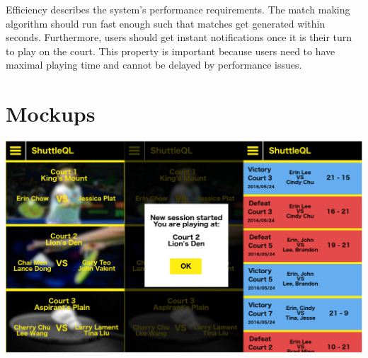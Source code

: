 \documentclass{article}
\begin{document}
Efficiency describes the system's performance requirements.
The match making algorithm should run fast enough such that matches get generated within seconds.
Furthermore, users should get instant notifications once it is their turn to play on the court.
This property is important because users need to have maximal playing time and cannot be delayed by performance issues.

\section{Mockups}
\includegraphics[width=15cm]{combined}
\end{document}
